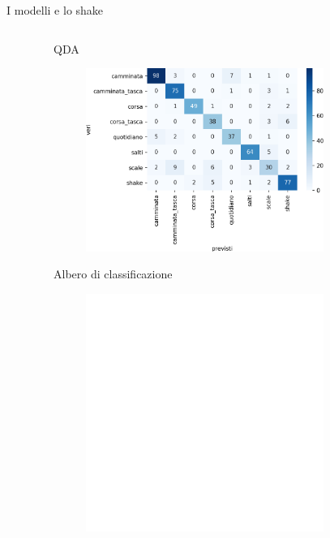 \documentclass{beamer}
\begin{document}
\begin{frame}{I modelli e lo shake}
\begin{columns}[T]
\begin{column}{.5\textwidth}
\begin{figure}[H]
\end{figure}
\end{column}%
\hfill%
\begin{column}{.5\textwidth}
\begin{center}
\small{QDA}
\end{center}
\begin{figure}[H]
\includegraphics[width=0.8\textwidth]{../figure/confusionMatrix-QDA.png}
\end{figure}
\begin{center}
Albero di classificazione
\end{center}
\begin{figure}[H]
\includegraphics[width=0.8\textwidth]{../figure/confusionMatrix-Tree.png}
\end{figure}
\end{column}%
\end{columns}
\end{frame}
\end{document}
